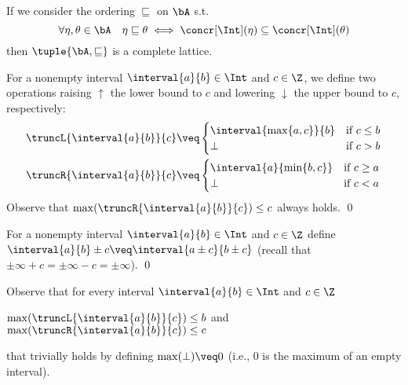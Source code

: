 \begin{observation}
  If we consider the ordering \(\sqsubseteq\) on \(\bA\)
  s.t. \[\forall \eta, \theta \in \bA \quad \eta \sqsubseteq \theta
  \iff \concr[\Int](\eta) \subseteq \concr[\Int](\theta)\] then
  \(\tuple{\bA, \sqsubseteq}\) is a complete lattice.
\end{observation}

\begin{definition}
  \label{de:trunc}
  For a nonempty interval \(\interval{a}{b} \in \Int\) and \(c \in \Z\), we define
  two operations raising \(\uparrow\) the lower bound to \(c\) and lowering \(\downarrow\) the upper
  bound to \(c\), respectively:
  \begin{align*}
    &\truncL{\interval{a}{b}}{c} \veq 
    \begin{cases} 
      \interval{\max\{a,c\}}{b} & \text{if } c\leq b\\
      \bot & \text{if } c > b
    \end{cases}
    \\
    &\truncR{\interval{a}{b}}{c} \veq 
    \begin{cases}   
      \interval{a}{\min\{b,c\}} & \text{if } c\geq a\\
      \bot & \text{if } c < a 
    \end{cases} 
  \end{align*}
  Observe that \(\max(\truncR{\interval{a}{b}}{c})\leq c\) always holds. \qed   
\end{definition}

\begin{definition}
  \label{de:add}
  For a nonempty interval \(\interval{a}{b} \in \Int\) and \(c \in \Z\) define
  \(\interval{a}{b} \pm c \veq \interval{a\pm c}{b\pm c}\) (recall that \(\pm \infty + c = \pm\infty - c = \pm\infty\)).  
  \qed
\end{definition}


Observe that for every interval \(\interval{a}{b} \in \Int\) and
\(c \in \Z\)
\begin{center}
  \(\max(\truncL{\interval{a}{b}}{c}) \leq b\)
  \qquad and \qquad
  \(\max(\truncR{\interval{a}{b}}{c}) \leq c\)
\end{center}
that trivially holds by 
defining \(\max (\bot)  \veq 0\) (i.e., \(0\) is the maximum of
an empty interval).

